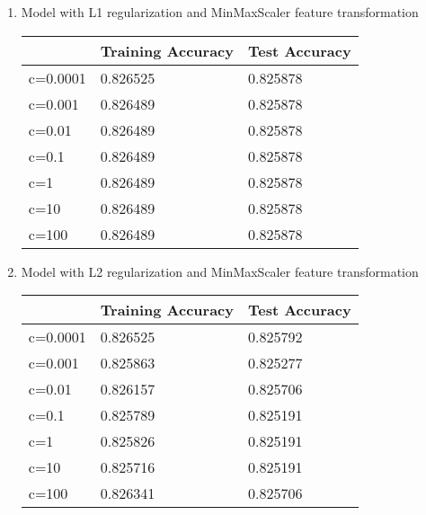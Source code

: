 \documentclass[12pt]{article}
\begin{document}
\begin{enumerate}
\begin{enumerate}
		\item Model with L1 regularization and MinMaxScaler feature transformation
		
		\begin{center}
			\begin{tabular}{|l|l|l|}
				\hline
				& Training Accuracy & Test Accuracy \\ \hline
				c=0.0001 & 0.826525          & 0.825878      \\ \hline
				c=0.001  & 0.826489          & 0.825878      \\ \hline
				c=0.01   & 0.826489          & 0.825878      \\ \hline
				c=0.1    & 0.826489          & 0.825878      \\ \hline
				c=1      & 0.826489          & 0.825878      \\ \hline
				c=10     & 0.826489          & 0.825878      \\ \hline
				c=100    & 0.826489          & 0.825878      \\ \hline
			\end{tabular}
		\end{center}
	
		\item Model with L2 regularization and MinMaxScaler feature transformation
		
		\begin{center}
			\begin{tabular}{|l|l|l|}
				\hline
				& Training Accuracy & Test Accuracy \\ \hline
				c=0.0001 & 0.826525          & 0.825792      \\ \hline
				c=0.001  & 0.825863          & 0.825277      \\ \hline
				c=0.01   & 0.826157          & 0.825706      \\ \hline
				c=0.1    & 0.825789          & 0.825191      \\ \hline
				c=1      & 0.825826          & 0.825191      \\ \hline
				c=10     & 0.825716          & 0.825191      \\ \hline
				c=100    & 0.826341          & 0.825706      \\ \hline
			\end{tabular}
		\end{center}
		\end{enumerate}
	
	\pagebreak
	

\end{enumerate}
\end{document}
